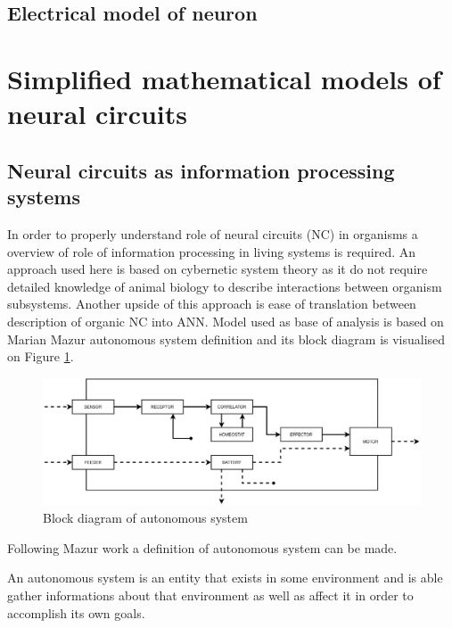 \FloatBarrier
\subsection{Electrical model of neuron}

\FloatBarrier
\section{Simplified mathematical models of neural circuits}

\FloatBarrier
\subsection{Neural circuits as information processing systems}
In order to properly understand role of neural circuits (NC) in organisms a overview of role
of information processing in living systems is required. An approach used here is based on 
cybernetic system theory \cite{Wiener2011} as it do not require detailed knowledge of animal
biology to describe interactions between organism subsystems. Another upside of this approach is 
ease of translation between description of organic NC into ANN.
Model used as base of analysis is based on Marian Mazur autonomous system definition 
\cite{Mazur1966} and its block diagram is visualised on Figure \ref{fig:auto_system}. 
\begin{figure}[htb] 
	\centering
	\includegraphics[width=\textwidth]{figures/auto_system}
	\caption{Block diagram of autonomous system}
	\label{fig:auto_system}
\end{figure}
Following Mazur work a definition of autonomous system can be made.
\begin{definition}
	An autonomous system is an entity that exists in some environment and is able gather 
	informations about that environment as well as affect it in order to accomplish its own
	goals.
\end{definition}
